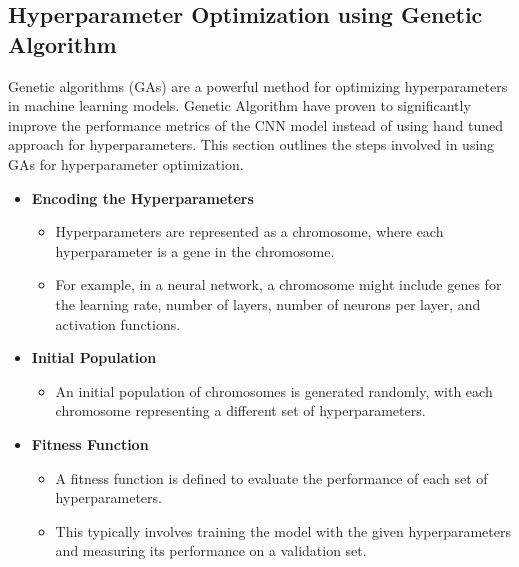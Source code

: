 \subsection{Hyperparameter Optimization using Genetic Algorithm}
Genetic algorithms (GAs) are a powerful method for optimizing hyperparameters
in machine learning models. Genetic Algorithm have proven to significantly
improve the performance metrics of the CNN model instead of using hand tuned
approach for hyperparameters. This section outlines the steps involved in using
GAs for hyperparameter optimization\cite{9058307}.
\begin{itemize}
    \item \textbf{Encoding the Hyperparameters}
          \begin{itemize}
              \item Hyperparameters are represented as a chromosome, where each
                    hyperparameter is a
                    gene in the chromosome.
              \item For example, in a neural network, a chromosome might
                    include genes for the
                    learning rate, number of layers, number of neurons per
                    layer, and activation
                    functions.
          \end{itemize}

    \item \textbf{Initial Population}
          \begin{itemize}
              \item An initial population of chromosomes is generated randomly,
                    with each
                    chromosome representing a different set of hyperparameters.
          \end{itemize}

    \item \textbf{Fitness Function}
          \begin{itemize}
              \item A fitness function is defined to evaluate the performance
                    of each set of
                    hyperparameters.
              \item This typically involves training the model with the given
                    hyperparameters and
                    measuring its performance on a validation set.
          \end{itemize}


\end{itemize}

